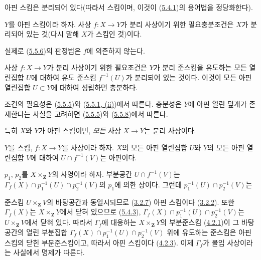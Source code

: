 \begin{corollary}[5.5.7]
\label{I.5.5.7-ko}
아핀 스킴은 분리되어 있다(따라서 스킴이며, 이것이
(\hyperref[I.5.4.1-ko]{5.4.1})의 용어법을 정당화한다).
\end{corollary}

\begin{corollary}[5.5.8]
\label{I.5.5.8-ko}
$Y$를 아핀 스킴이라 하자. 사상 $f:X\to Y$가 분리 사상이기 위한
필요충분조건은 $X$가 분리되어 있는 것(다시 말해 $X$가 스킴인
것)이다.
\end{corollary}

실제로 (\hyperref[I.5.5.6-ko]{5.5.6})의 판정법은 $f$에 의존하지
않는다.

\begin{corollary}[5.5.9]
\label{I.5.5.9-ko}
사상 $f:X\to Y$가 분리 사상이기 위한 필요조건은 $Y$가 분리
준스킴을 유도하는 모든 열린집합 $U$에 대하여 유도 준스킴
$f^{-1}(U)$가 분리되어 있는 것이다. 이것이 모든 아핀 열린집합
$U\subset Y$에 대하여 성립하면 충분하다.
\end{corollary}

조건의 필요성은 (\hyperref[I.5.5.5-ko]{5.5.5})와
(\hyperref[I.5.5.1-ko]{5.5.1, (ii)})에서 따른다. 충분성은 $Y$에 아핀
열린 덮개가 존재한다는 사실을 고려하면
(\hyperref[I.5.5.5-ko]{5.5.5})와
(\hyperref[I.5.5.8-ko]{5.5.8})에서 따른다.

특히 $X$와 $Y$가 아핀 스킴이면, \emph{모든} 사상 $X\to Y$는 분리
사상이다.

\begin{proposition}[5.5.10]
\label{I.5.5.10-ko}
$Y$를 스킴, $f:X\to Y$를 사상이라 하자. $X$의 모든 아핀 열린집합
$U$와 $Y$의 모든 아핀 열린집합 $V$에 대하여
$U\cap f^{-1}(V)$는 아핀이다.
\end{proposition}

$p_1$, $p_2$를 $X\times_{\mathbf{Z}}Y$의 사영이라 하자. 부분공간
$U\cap f^{-1}(V)$는
$\Gamma_f(X)\cap p_1^{-1}(U)\cap p_2^{-1}(V)$의 $p_1$에 의한
상이다. 그런데 $p_1^{-1}(U)\cap p_2^{-1}(V)$는

준스킴 $U\times_{\mathbf{Z}}V$의 바탕공간과 동일시되므로
(\hyperref[I.3.2.7-ko]{3.2.7}) 아핀 스킴이다
(\hyperref[I.3.2.2-ko]{3.2.2}). 또한 $\Gamma_f(X)$는
$X\times_{\mathbf{Z}}Y$에서 닫혀 있으므로
(\hyperref[I.5.4.3-ko]{5.4.3}),
$\Gamma_f(X)\cap p_1^{-1}(U)\cap p_2^{-1}(V)$는
$U\times_{\mathbf{Z}}V$에서 닫혀 있다. 따라서 $\Gamma_f$에 대응하는
$X\times_{\mathbf{Z}}Y$의 부분준스킴
(\hyperref[I.4.2.1-ko]{4.2.1})이 그 바탕공간의 열린 부분집합
$\Gamma_f(X)\cap p_1^{-1}(U)\cap p_2^{-1}(V)$ 위에 유도하는 준스킴은
아핀 스킴의 닫힌 부분준스킴이고, 따라서 아핀 스킴이다
(\hyperref[I.4.2.3-ko]{4.2.3}). 이제 $\Gamma_f$가 몰입 사상이라는
사실에서 명제가 따른다.

